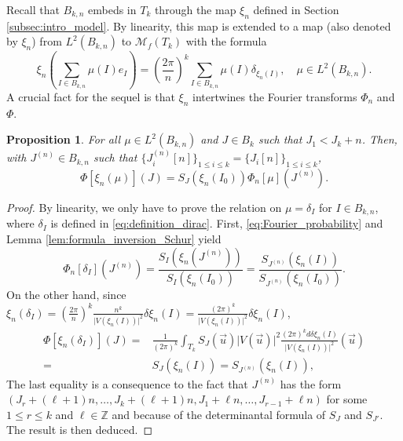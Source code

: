 \documentclass[10pt,11pt]{amsart}%
\newtheorem{proposition}[theorem]{Proposition}
\begin{document}
Recall that $ B_{k,n}$ embeds in $ T_{k}$ through the map $\xi_{n}$ defined in Section \ref{subsec:intro_model}. By linearity, this map is extended to a map (also denoted by $\xi_{n}$) from $L^2(B_{k,n})$ to $\mathcal{M}_f( T_{k})$ with the formula 
$$\xi_{n}\left(\sum_{I\in B_{k,n}}\mu(I)e_I\right)=\left(\frac{2\pi}{n}\right)^k\sum_{I\in B_{k,n}}\mu(I)\delta_{\xi_n(I)}, \quad \mu\in L^2(B_{k,n}).$$
A crucial fact for the sequel is that $\xi_{n}$ intertwines the Fourier transforms $\Phi_n$ and $\Phi$.
\begin{proposition}\label{prop:equiv_dft_cft}
For all $\mu\in L^2(B_{k,n})$ and $J\in B_{k}$ such that $J_1< J_k+n$. Then, with $J^{(n)}\in B_{k,n}$ such that $\{J^{(n)}_i[n]\}_{1\leq i\leq k}=\{J_i[n]\}_{1\leq i\leq k}$,
$$\Phi[\xi_{n}(\mu)] (J)=S_{J}(\xi_{n}(I_0))\Phi_n[\mu](J^{(n)}).$$
\end{proposition}
\begin{proof}
By linearity, we only have to prove the relation on $\mu=\delta_I$ for $I\in B_{k,n}$, where $\delta_I$ is defined in \eqref{eq:definition_dirac}. First, \eqref{eq:Fourier_probability} and Lemma \ref{lem:formula_inversion_Schur} yield
$$\Phi_n[\delta_I](J^{(n)})=\frac{S_{I}(\xi_{n}(J^{(n)}))}{S_I(\xi_{n}(I_0))}=\frac{S_{J^{(n)}}(\xi_{n}(I))}{S_{J^{(n)}}(\xi_{n}(I_0))}.$$
On the other hand,  since $\xi_n(\delta_I)=\left(\frac{2\pi}{n}\right)^k\frac{n^k}{\vert V(\xi_n(I))\vert^2}\delta{\xi_n(I)}=\frac{(2\pi)^k}{\vert V(\xi_n(I))\vert^2}\delta{\xi_n(I)}$,
\begin{align*}
\Phi[\xi_{n}(\delta_I)](J)=&\frac{1}{(2\pi)^k}\int_{ T_{k}}S_{J}(\vec{u})\vert V(\vec{u})\vert^2\frac{(2\pi)^kd\delta{\xi_n(I)}}{\vert V(\xi_n(I))\vert^2}(\vec{u})\\
=&S_{J}(\xi_{n}(I))=S_{J^{(n)}}(\xi_{n}(I)),
\end{align*}
The last equality is a consequence to the fact that $J^{(n)}$ has the form $(J_r+(\ell+1)n,\ldots,J_k+(\ell+1)n, J_1+\ell n,\ldots, J_{r-1}+\ell n)$ for some $1\leq r\leq k$ and $\ell\in\mathbb{Z}$ and because of the determinantal formula of $S_J$ and $S_{J'}$. The result is then deduced.
\end{proof}
\end{document}
